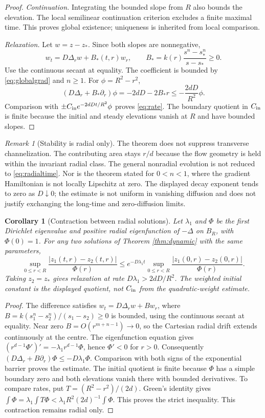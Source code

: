\documentclass[11pt,a4paper]{article}
\newtheorem{corollary}[theorem]{Corollary}
\theoremstyle{definition}\newtheorem{definition}[theorem]{Definition}
\theoremstyle{remark}\newtheorem{remark}[theorem]{Remark}
\begin{document}
\begin{proof}
\emph{Continuation.} Integrating the bounded slope from $R$ also bounds the elevation. The local semilinear continuation criterion excludes a finite maximal time. This proves global existence; uniqueness is inherited from local comparison.

\emph{Relaxation.} Let $w=z-z_*$. Since both slopes are nonnegative,
\[
 w_t=D\Delta_rw+B_*(t,r)w_r,\qquad
 B_*=k(r)\frac{s^n-s_*^n}{s-s_*}\geq0.
\]
Use the continuous secant at equality. The coefficient is bounded by \eqref{eq:globalgrad} and $n\geq1$. For $\phi=R^2-r^2$,
\[
 (D\Delta_r+B_*\partial_r)\phi=-2dD-2B_*r
 \leq-\frac{2dD}{R^2}\phi.
\]
Comparison with $\pm C_{\rm in}e^{-2dDt/R^2}\phi$ proves \eqref{eq:rate}. The boundary quotient in $C_{\rm in}$ is finite because the initial and steady elevations vanish at $R$ and have bounded slopes.
\end{proof}

\begin{remark}[Stability is radial only]
The theorem does not suppress transverse channelization. The contributing area stays $r/d$ because the flow geometry is held within the invariant radial class. The general nonradial evolution is not reduced to \eqref{eq:radialtime}. Nor is the theorem stated for $0<n<1$, where the gradient Hamiltonian is not locally Lipschitz at zero. The displayed decay exponent tends to zero as $D\downarrow0$; the estimate is not uniform in vanishing diffusion and does not justify exchanging the long-time and zero-diffusion limits.
\end{remark}


\begin{corollary}[Contraction between radial solutions]\label{cor:contraction}
Let $\lambda_1$ and $\Phi$ be the first Dirichlet eigenvalue and positive
radial eigenfunction of $-\Delta$ on $B_R$, with $\Phi(0)=1$.
For any two solutions of Theorem \ref{thm:dynamic} with the same parameters,
\[
 \sup_{0\leq r<R}\frac{|z_1(t,r)-z_2(t,r)|}{\Phi(r)}
 \leq e^{-D\lambda_1t}
 \sup_{0\leq r<R}\frac{|z_1(0,r)-z_2(0,r)|}{\Phi(r)}.
\]
Taking $z_2=z_*$ gives relaxation at rate $D\lambda_1>2dD/R^2$.
The weighted initial constant is the displayed quotient, not $C_{\rm in}$
from the quadratic-weight estimate.
\end{corollary}
\begin{proof}
The difference satisfies $w_t=D\Delta_rw+B w_r$, where
$B=k(s_1^n-s_2^n)/(s_1-s_2)\geq0$ is bounded, using the continuous
secant at equality. Near zero $B=O(r^{m+n-1})\to0$, so the Cartesian
radial drift extends continuously at the centre.
The eigenfunction equation gives
$(r^{d-1}\Phi')'=-\lambda_1r^{d-1}\Phi$, hence $\Phi'<0$ for $r>0$.
Consequently $(D\Delta_r+B\partial_r)\Phi\leq-D\lambda_1\Phi$.
Comparison with both signs of the exponential barrier proves the estimate.
The initial quotient is finite because $\Phi$ has a simple boundary zero
and both elevations vanish there with bounded derivatives.
To compare rates, put $T=(R^2-r^2)/(2d)$. Green's identity gives
$\int\Phi=\lambda_1\int T\Phi<\lambda_1R^2(2d)^{-1}\int\Phi$.
This proves the strict inequality. This contraction remains radial only.
\end{proof}
\end{document}

